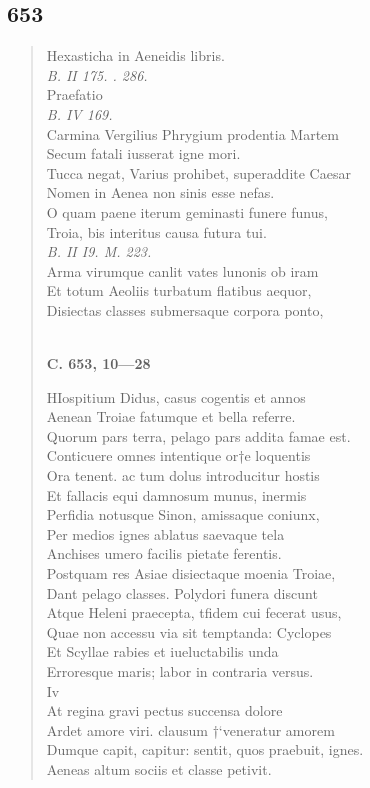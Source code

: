 \documentclass[11pt, a4paper]{report}
\begin{document}
            \subsection*{653}
      \begin{verse}
      Hexasticha in Aeneidis libris. \\ \textit{B. II 175. . 286.} \\ Praefatio \\ \textit{B. IV 169.} \\ Carmina Vergilius Phrygium prodentia Martem \\ Secum fatali iusserat igne mori. \\ Tucca negat, Varius prohibet, superaddite Caesar \\ Nomen in Aenea non sinis esse nefas. \\ O quam paene iterum geminasti funere funus, \\ Troia, bis interitus causa futura tui. \\ \textit{B. II I9. M. 223.} \\ Arma virumque canlit vates lunonis ob iram \\ Et totum Aeoliis turbatum flatibus aequor, \\ Disiectas classes submersaque corpora ponto, \\ 
        ﻿\pagebreak 
    \begin{center} \textbf{C. 653, 10—28} \end{center} \marginpar{[122]} HIospitium Didus, casus cogentis et annos \\ Aenean Troiae fatumque et bella referre. \\ Quorum pars terra, pelago pars addita famae est. \\ Conticuere omnes intentique or†e loquentis \\ Ora tenent. ac tum dolus introducitur hostis \\ Et fallacis equi damnosum munus, inermis \\ Perfidia notusque Sinon, amissaque coniunx, \\ Per medios ignes ablatus saevaque tela \\ Anchises umero facilis pietate ferentis. \\ Postquam res Asiae \rbrack  disiectaque moenia Troiae, \\ Dant pelago classes. Polydori funera discunt \\ Atque Heleni praecepta, tfidem cui fecerat usus, \\ Quae non accessu via sit temptanda: Cyclopes \\ Et Scyllae rabies et iueluctabilis unda \\ Erroresque maris; labor in contraria versus. \\ Iv \\ At regina gravi \rbrack  pectus succensa dolore \\ Ardet amore viri. clausum †‘veneratur amorem \\ Dumque capit, capitur: sentit, quos praebuit, ignes. \\ Aeneas altum sociis et classe petivit. \\ 

\end{verse}
\end{document}
